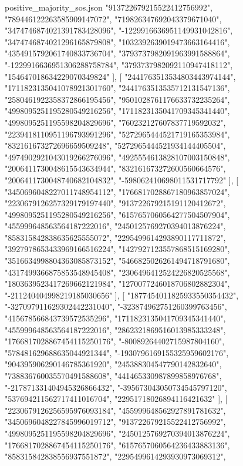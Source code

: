 \begin{filecontents*}[overwrite]{positive_majority_sos.json}
    "913722679215522412756992",
    "789446122263585909147072",
    "719826347692043379671040",
    "3474746874021391783428096",
    "-1229916636951149931042816",
    "3474746874021296165879808",
    "1032392639019473663164416",
    "4354915792061740833736704",
    "3793737982091963991588864",
    "-1229916636951306288758784",
    "3793737982092110947418112",
    "154647018634229070349824"
   ],
   [
    "2441763513534803443974144",
    "1711823135041078921301760",
    "2441763513535712131547136",
    "2580461922358372866195456",
    "9501028761176633732235264",
    "4998095251195280549216256",
    "1711823135041709345341440",
    "4998095251195598204829696",
    "760232127607837719592032",
    "2239418110951196793991296",
    "5272965444521719165353984",
    "832161673272696659509248",
    "5272965444521934144405504",
    "4974902921043019266276096",
    "4925554613828107003150848",
    "2006411730048615543634944",
    "832161673272600560664576",
    "2006411730048740682104832",
    "-598062410698011531717792"
   ],
   [
    "3450696048227011748954112",
    "1766817028867180963857024",
    "2230679126257329179197440",
    "913722679215191120412672",
    "4998095251195280549216256",
    "6157657060564277504507904",
    "455999648563564187222016",
    "2450125769270394013876224",
    "858315842838635625555072",
    "2295499614293890117711872",
    "3927978653433969166516224",
    "1427927123557868515169280",
    "3516634998804363085873152",
    "5466825026261494718791680",
    "4317499366875853548945408",
    "2306496412524226820525568",
    "1803639523417269662121984",
    "1270077246018706802882304",
    "-211240404998219185030656"
   ],
   [
    "1877454011825933550354432",
    "-327097911629302442231040",
    "-323874962751260399763456",
    "415678566843739572535296",
    "1711823135041709345341440",
    "455999648563564187222016",
    "2862321869516013985333248",
    "1766817028867454115250176",
    "-80089264402715987804160",
    "578481629688635044921344",
    "-1930796169155325959602176",
    "904395906290146785361920",
    "245388304547790142832640",
    "738836760035570491588608",
    "441465330987899858976768",
    "-217871331404945326866432",
    "-395673043050734545797120",
    "537694211562717411016704",
    "22951718026894116421632"
   ],
   [
    "2230679126256595976093184",
    "455999648562927891781632",
    "3450696048227845996019712",
    "913722679215522412756992",
    "4998095251195598204829696",
    "2450125769270394013876224",
    "1766817028867454115250176",
    "6157657060564236433883136",
    "858315842838556937551872",
    "2295499614293930973069312",

\end{filecontents*}
